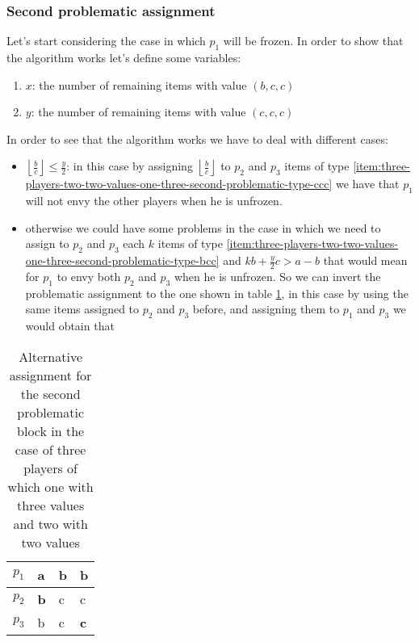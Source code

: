 \documentclass{article}
\begin{document}
\subsubsection{Second problematic assignment}
Let's start considering the case in which $p_1$ will be frozen. In order to show that the algorithm works let's define some variables:
\begin{enumerate}
    \item $x$: the number of remaining items with value $(b,c,c)$ \label{item:three-players-two-two-values-one-three-second-problematic-type-bcc}
    \item $y$: the number of remaining items with value $(c,c,c)$
    \label{item:three-players-two-two-values-one-three-second-problematic-type-ccc}
\end{enumerate}
In order to see that the algorithm works we have to deal with different cases:
\begin{itemize}
    \item $\left\lfloor \frac{b}{c} \right\rfloor \le \frac{y}{2}$: in this case by assigning $\left\lfloor \frac{b}{c} \right\rfloor$ to $p_2$ and $p_3$ items of type \ref{item:three-players-two-two-values-one-three-second-problematic-type-ccc} we have that $p_1$ will not envy the other players when he is unfrozen.
    \item otherwise we could have some problems in the case in which we need to assign to $p_2$ and $p_3$ each $k$ items of type \ref{item:three-players-two-two-values-one-three-second-problematic-type-bcc} and $kb + \frac{y}{2}c > a-b$ that would mean for $p_1$ to envy both $p_2$ and $p_3$ when he is unfrozen. So we can invert the problematic assignment to the one shown in table \ref{table:three-players-two-two-values-one-three-second-problematic-invert-assignment-second-problematic}, in this case by using the same items assigned to $p_2$ and $p_3$ before, and assigning them to $p_1$ and $p_3$ we would obtain that 
\end{itemize}
\begin{table}[h]
    \centering
    \begin{tabular}{|l|l|l|l|}
    \hline
    $p_1$ & a & \textbf{b} & b \\ \hline
    $p_2$ & \textbf{b} & c & c \\ \hline
    $p_3$ & b & c & \textbf{c} \\ \hline
    \end{tabular}
    \caption{Alternative assignment for the second problematic block in the case of three players of which one with three values and two with two values}
    \label{table:three-players-two-two-values-one-three-second-problematic-invert-assignment-second-problematic}
\end{table}
\end{document}
